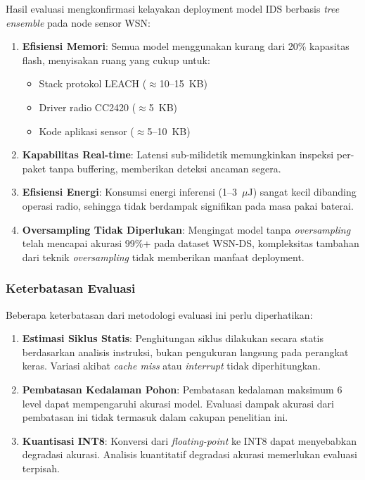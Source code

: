Hasil evaluasi mengkonfirmasi kelayakan deployment model IDS berbasis \textit{tree ensemble} pada node sensor WSN:

\begin{enumerate}
    \item \textbf{Efisiensi Memori}: Semua model menggunakan kurang dari 20\% kapasitas flash, menyisakan ruang yang cukup untuk:
    \begin{itemize}
        \item Stack protokol LEACH ($\approx$10--15~KB)
        \item Driver radio CC2420 ($\approx$5~KB)
        \item Kode aplikasi sensor ($\approx$5--10~KB)
    \end{itemize}
    
    \item \textbf{Kapabilitas Real-time}: Latensi sub-milidetik memungkinkan inspeksi per-paket tanpa buffering, memberikan deteksi ancaman segera.
    
    \item \textbf{Efisiensi Energi}: Konsumsi energi inferensi (1--3~$\mu$J) sangat kecil dibanding operasi radio, sehingga tidak berdampak signifikan pada masa pakai baterai.
    
    \item \textbf{Oversampling Tidak Diperlukan}: Mengingat model tanpa \textit{oversampling} telah mencapai akurasi 99\%+ pada dataset WSN-DS, kompleksitas tambahan dari teknik \textit{oversampling} tidak memberikan manfaat deployment.
\end{enumerate}

\subsubsection{Keterbatasan Evaluasi}

Beberapa keterbatasan dari metodologi evaluasi ini perlu diperhatikan:

\begin{enumerate}
    \item \textbf{Estimasi Siklus Statis}: Penghitungan siklus dilakukan secara statis berdasarkan analisis instruksi, bukan pengukuran langsung pada perangkat keras. Variasi akibat \textit{cache miss} atau \textit{interrupt} tidak diperhitungkan.
    
    \item \textbf{Pembatasan Kedalaman Pohon}: Pembatasan kedalaman maksimum 6 level dapat mempengaruhi akurasi model. Evaluasi dampak akurasi dari pembatasan ini tidak termasuk dalam cakupan penelitian ini.
    
    \item \textbf{Kuantisasi INT8}: Konversi dari \textit{floating-point} ke INT8 dapat menyebabkan degradasi akurasi. Analisis kuantitatif degradasi akurasi memerlukan evaluasi terpisah.
\end{enumerate}

